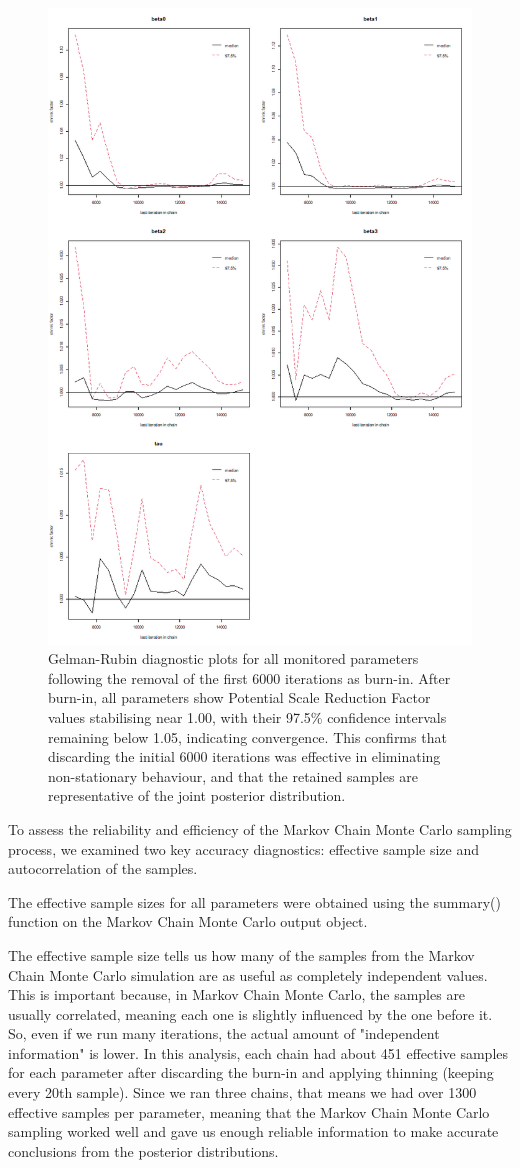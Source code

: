 \documentclass[]{article}
\begin{document}
\begin{figure}
	\centering
	\includegraphics[width=0.7\linewidth]{img/img-gelman-plot-all-bi}
	\caption{Gelman-Rubin diagnostic plots for all monitored parameters following the removal of the first 6000 iterations as burn-in. After burn-in, all parameters show Potential Scale Reduction Factor values stabilising near 1.00, with their 97.5\% confidence intervals remaining below 1.05, indicating convergence. This confirms that discarding the initial 6000 iterations was effective in eliminating non-stationary behaviour, and that the retained samples are representative of the joint posterior distribution.}	\label{fig:img-gelman-plot-all-bi}
\end{figure}


To assess the reliability and efficiency of the Markov Chain Monte Carlo sampling process, we examined two key accuracy diagnostics: effective sample size  and autocorrelation of the samples.

The effective sample sizes for all parameters were obtained using the summary() function on the Markov Chain Monte Carlo output object.

The effective sample size tells us how many of the samples from the Markov Chain Monte Carlo simulation are as useful as completely independent values. This is important because, in Markov Chain Monte Carlo, the samples are usually correlated, meaning each one is slightly influenced by the one before it. So, even if we run many iterations, the actual amount of "independent information" is lower.
In this analysis, each chain had about 451 effective samples for each parameter after discarding the burn-in and applying thinning (keeping every 20th sample). Since we ran three chains, that means we had over 1300 effective samples per parameter, meaning that the Markov Chain Monte Carlo sampling worked well and gave us enough reliable information to make accurate conclusions from the posterior distributions.
\end{document}
